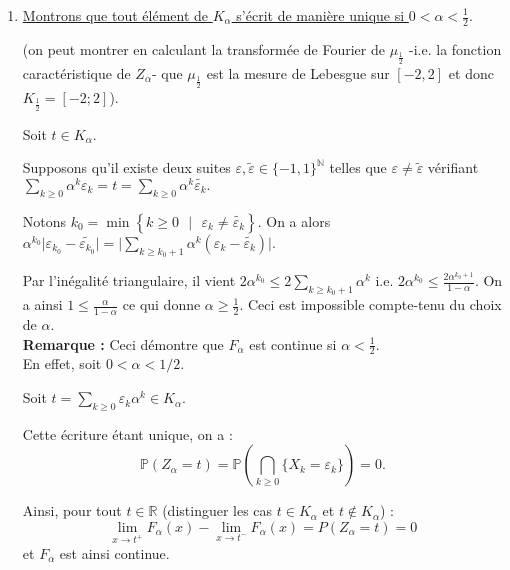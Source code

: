 \begin{enumerate}
\item \underline{Montrons que tout élément de $K_{\alpha}$ s'écrit de manière unique si $0<\alpha<\frac{1}{2}.$}
    
(on peut montrer en calculant la transformée de Fourier de $\mu_{\frac{1}{2}}$ -i.e. la fonction caractéristique de $Z_{\alpha}$- que $\mu_{\frac{1}{2}}$ est la mesure de Lebesgue sur $[-2,2]$ et donc $K_{\frac{1}{2}}=[-2;2]$).

Soit $t\in K_{\alpha}.$ 

Supposons qu'il existe deux suites $\varepsilon,\tilde{\varepsilon}\in\{-1,1\}^\mathbb{N}$ telles que $\varepsilon\neq \tilde{\varepsilon}$ vérifiant $\displaystyle \sum_{k\geq 0}\alpha^{k}\varepsilon_{k}=t=\sum_{k\geq 0}\alpha^{k}\tilde{\varepsilon_{k}}.$

Notons $k_{0}=\min\left\{ k\geq 0\mbox{ }|\mbox{ } \varepsilon_{k}\neq \tilde{\varepsilon_{k}} \right\}.$ On a alors $\displaystyle \alpha^{k_{0}}\vert \varepsilon_{k_{0}}-\tilde{\varepsilon_{k_{0}}}\vert =\big\vert \sum_{k\geq k_{0}+1}\alpha^{k}\left(\varepsilon_{k}-\tilde{\varepsilon_{k}}\right)\big\vert.$

Par l'inégalité triangulaire, il vient $\displaystyle 2\alpha^{k_{0}}\leq 2\sum_{k\geq k_{0}+1}\alpha^{k} \mbox{ i.e. } 2\alpha^{k_{0}}\leq \frac{2\alpha^{k_{0}+1}}{1-\alpha}.$
On a ainsi $\displaystyle 1\leq \frac{\alpha}{1-\alpha}$ ce qui donne $\alpha\geq \frac{1}{2}.$ Ceci est impossible compte-tenu du choix de $\alpha.$\\

\textbf{Remarque :} Ceci démontre que $F_{\alpha}$ est continue si $\alpha<\frac{1}{2}.$\\

En effet, soit $0<\alpha<1/2.$ 

Soit $t=\sum\limits_{k\geq 0}\varepsilon_{k}\alpha^{k}\in K_{\alpha}.$

Cette écriture étant unique, on a : $$\mathbb{P}(Z_{\alpha}=t)=\mathbb{P}\left( \bigcap_{k\geq 0}\{X_{k}=\varepsilon_{k}\} \right)=0.$$

Ainsi, pour tout $t\in\mathbb{R}$ (distinguer les cas $t\in K_{\alpha}$ et $t\notin K_{\alpha}$) : $$\lim_{x\rightarrow t^{+}}F_{\alpha}(x)-\lim_{x\rightarrow t^{-}}F_{\alpha}(x)=P(Z_{\alpha}=t)=0$$ et $F_{\alpha}$ est ainsi continue.\\ 




\end{enumerate}
